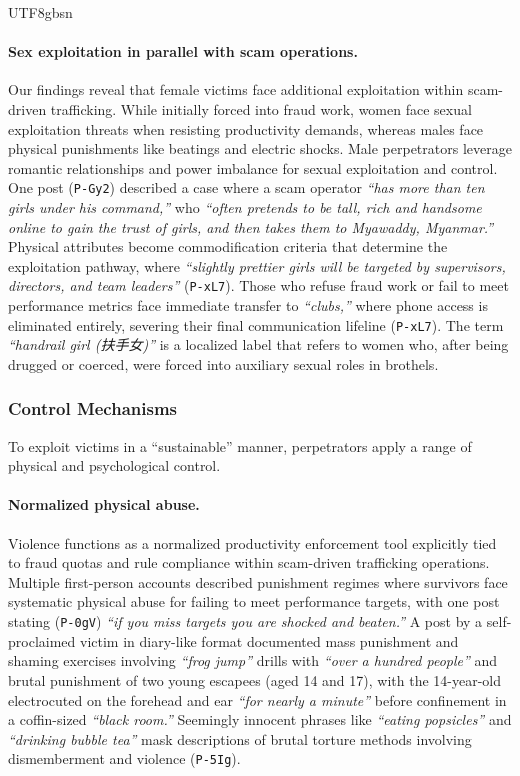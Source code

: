 \documentclass[sigconf,nonacm]{acmart}
\begin{document}
\begin{CJK}{UTF8}{gbsn}
\paragraph{\textbf{Sex exploitation in parallel with scam operations.}} Our findings reveal that female victims face additional exploitation within scam-driven trafficking. While initially forced into fraud work, women face sexual exploitation threats when resisting productivity demands, whereas males face physical punishments like beatings and electric shocks. Male perpetrators leverage romantic relationships and power imbalance for sexual exploitation and control. One post (\texttt{P-Gy2}) described a case where a scam operator \textit{``has more than ten girls under his command,''} who \textit{``often pretends to be tall, rich and handsome online to gain the trust of girls, and then takes them to Myawaddy, Myanmar.''} Physical attributes become commodification criteria that determine the exploitation pathway, where \textit{``slightly prettier girls will be targeted by supervisors, directors, and team leaders''} (\texttt{P-xL7}). Those who refuse fraud work or fail to meet performance metrics face immediate transfer to \textit{``clubs,''} where phone access is eliminated entirely, severing their final communication lifeline (\texttt{P-xL7}). The term \textit{``handrail girl (扶手女)''} is a localized label that refers to women who, after being drugged or coerced, were forced into auxiliary sexual roles in brothels.

\subsubsection{Control Mechanisms}
\label{sec:control_mechanisms}

To exploit victims in a ``sustainable'' manner, perpetrators apply a range of physical and psychological control.

\paragraph{\textbf{Normalized physical abuse.}} Violence functions as a normalized productivity enforcement tool explicitly tied to fraud quotas and rule compliance within scam-driven trafficking operations. Multiple first-person accounts described punishment regimes where survivors face systematic physical abuse for failing to meet performance targets, with one post stating (\texttt{P-0gV}) \textit{``if you miss targets you are shocked and beaten.''} A post by a self-proclaimed victim in diary-like format documented mass punishment and shaming exercises involving \textit{``frog jump''} drills with \textit{``over a hundred people''} and brutal punishment of two young escapees (aged 14 and 17), with the 14-year-old electrocuted on the forehead and ear \textit{``for nearly a minute''} before confinement in a coffin-sized \textit{``black room.''} Seemingly innocent phrases like \textit{``eating popsicles''} and \textit{``drinking bubble tea''} mask descriptions of brutal torture methods involving dismemberment and violence (\texttt{P-5Ig}).


\end{CJK}
\end{document}
